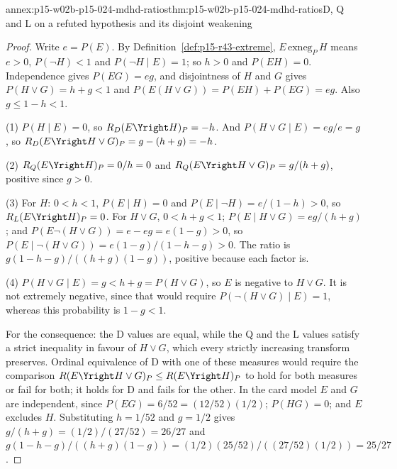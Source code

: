 \begin{annexitem}{annex:p15-w02b-p15-024-mdhd-ratios}{thm:p15-w02b-p15-024-mdhd-ratios}{D, Q and L on a refuted hypothesis and its disjoint weakening}
\begin{proof}
Write \(e=P(E)\). By Definition~\ref{def:p15-r43-extreme},
\(E\,\mathrm{exneg}_P\,H\) means \(e>0\), \(P(\neg H)<1\) and
\(P(\neg H\mid E)=1\); so \(h>0\) and \(P(EH)=0\). Independence gives
\(P(EG)=eg\), and disjointness of \(H\) and \(G\) gives
\(P(H\vee G)=h+g<1\) and
\(P(E(H\vee G))=P(EH)+P(EG)=eg\). Also \(g\leq1-h<1\).

(1) \(P(H\mid E)=0\), so \(R_D(E\Yright H)_P=-h\). And
\(P(H\vee G\mid E)=eg/e=g\), so
\(R_D(E\Yright H\vee G)_P=g-(h+g)=-h\).

(2) \(R_Q(E\Yright H)_P=0/h=0\) and
\(R_Q(E\Yright H\vee G)_P=g/(h+g)\), positive since \(g>0\).

(3) For \(H\): \(0<h<1\), \(P(E\mid H)=0\) and
\(P(E\mid\neg H)=e/(1-h)>0\), so \(R_L(E\Yright H)_P=0\). For
\(H\vee G\), \(0<h+g<1\);
\(P(E\mid H\vee G)=eg/(h+g)\); and
\(P(E\neg(H\vee G))=e-eg=e(1-g)>0\), so
\(P(E\mid\neg(H\vee G))=e(1-g)/(1-h-g)>0\). The ratio is
\(g(1-h-g)/((h+g)(1-g))\), positive because each factor is.

(4) \(P(H\vee G\mid E)=g<h+g=P(H\vee G)\), so \(E\) is negative to
\(H\vee G\). It is not extremely negative, since that would require
\(P(\neg(H\vee G)\mid E)=1\), whereas this probability is \(1-g<1\).

For the consequence: the D values are equal, while the Q and the L
values satisfy a strict inequality in favour of \(H\vee G\), which every
strictly increasing transform preserves. Ordinal equivalence of D with
one of these measures would require the comparison
\(R(E\Yright H\vee G)_P\leq R(E\Yright H)_P\) to hold for both
measures or fail for both; it holds for D and fails for the other. In
the card model \(E\) and \(G\) are independent, since
\(P(EG)=6/52=(12/52)(1/2)\); \(P(HG)=0\); and \(E\) excludes \(H\).
Substituting \(h=1/52\) and \(g=1/2\) gives
\(g/(h+g)=(1/2)/(27/52)=26/27\) and
\(g(1-h-g)/((h+g)(1-g))=(1/2)(25/52)/((27/52)(1/2))=25/27\).
\end{proof}
\end{annexitem}

